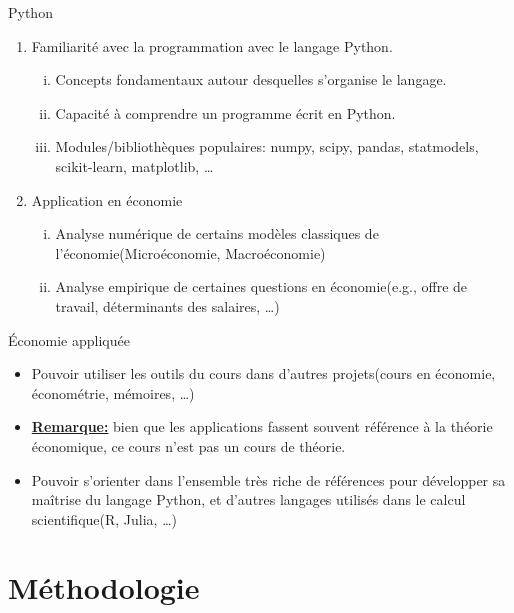 \begin{frame}[allowframebreaks]{Python}
\begin{enumerate}
    \item Familiarité avec la programmation avec le langage Python.
    \begin{enumerate}[(i)]
        \item Concepts fondamentaux autour desquelles s'organise le langage.
        \item Capacité à comprendre un programme écrit en Python.
        \item Modules/bibliothèques populaires: numpy, scipy, pandas, statmodels, scikit-learn, matplotlib, \ldots
    \end{enumerate}
    \item Application en économie
    \begin{enumerate}[(i)]
        \item Analyse numérique de certains modèles classiques de l'économie(Microéconomie, Macroéconomie)
        \item Analyse empirique de certaines questions en économie(e.g., offre de travail, déterminants des salaires, \ldots)
    \end{enumerate}
\end{enumerate}
\end{frame}

\begin{frame}[allowframebreaks]{\'Economie appliquée}
    \begin{itemize}
        \item Pouvoir utiliser les outils du cours dans d'autres projets(cours en économie, économétrie, mémoires, \ldots)
        \item \underline{\textbf{Remarque:}} bien que les applications fassent souvent référence à la théorie économique,
         ce cours n'est pas un cours de théorie.
         \item Pouvoir s'orienter dans l'ensemble très riche de références pour développer sa maîtrise du langage Python, 
         et d'autres langages utilisés dans le calcul scientifique(R, Julia, \ldots)
    \end{itemize}
\end{frame}

\section{Méthodologie}
\frame{\sectionpage}

